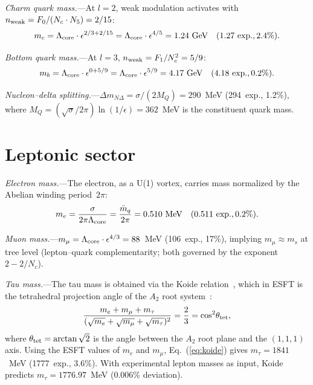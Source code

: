 ﻿\documentclass[aps,prl,twocolumn,superscriptaddress,showpacs]{revtex4-2}
\begin{document}
\textit{Charm quark mass.}---At $l=2$, weak modulation activates with
$n_{\rm weak} = F_0/(N_c \cdot N_5) = 2/15$:
\begin{equation}\label{eq:mc}
m_c = \Lambda_{\rm core}\cdot\epsilon^{2/3 + 2/15}
= \Lambda_{\rm core}\cdot\epsilon^{4/5} = 1.24~\text{GeV}\quad (1.27~\text{exp.}, 2.4\%).
\end{equation}

\textit{Bottom quark mass.}---At $l=3$, $n_{\rm weak} = F_1/N_c^2 = 5/9$:
\begin{equation}\label{eq:mb}
m_b = \Lambda_{\rm core}\cdot\epsilon^{0 + 5/9}
= \Lambda_{\rm core}\cdot\epsilon^{5/9} = 4.17~\text{GeV}\quad (4.18~\text{exp.}, 0.2\%).
\end{equation}

\textit{Nucleon--delta splitting.}---$\Delta m_{N\Delta} = \sigma/(2M_Q)
= 290$~MeV (294~exp., 1.2\%), where $M_Q = (\sqrt{\sigma}/2\pi)\ln(1/\epsilon)
= 362$~MeV is the constituent quark mass.


\section{Leptonic sector}

\textit{Electron mass.}---The electron, as a U(1) vortex, carries mass
normalized by the Abelian winding period~$2\pi$:
\begin{equation}\label{eq:me}
m_e = \frac{\sigma}{2\pi\Lambda_{\rm core}} = \frac{\bar{m}_q}{2\pi}
= 0.510~\text{MeV}\quad (0.511~\text{exp.}, 0.2\%).
\end{equation}

\textit{Muon mass.}---$m_\mu = \Lambda_{\rm core}\cdot\epsilon^{4/3}
= 88$~MeV (106~exp., 17\%), implying $m_\mu \approx m_s$ at tree level
(lepton--quark complementarity; both governed by the exponent $2-2/N_c$).

\textit{Tau mass.}---The tau mass is obtained via the Koide
relation~\cite{Koide1983}, which in ESFT is the tetrahedral
projection angle of the $A_2$ root system~\cite{PaperVII}:
\begin{equation}\label{eq:koide}
\frac{m_e + m_\mu + m_\tau}{(\sqrt{m_e} + \sqrt{m_\mu} + \sqrt{m_\tau})^2}
= \frac{2}{3} = \cos^2\!\theta_{\rm tet},
\end{equation}
where $\theta_{\rm tet} = \arctan\sqrt{2}$ is the angle between the
$A_2$ root plane and the $(1,1,1)$ axis. Using the ESFT values of
$m_e$ and $m_\mu$, Eq.~(\ref{eq:koide}) gives $m_\tau = 1841$~MeV
(1777~exp., 3.6\%). With experimental lepton masses as input, Koide
predicts $m_\tau = 1776.97$~MeV (0.006\% deviation).
\end{document}
